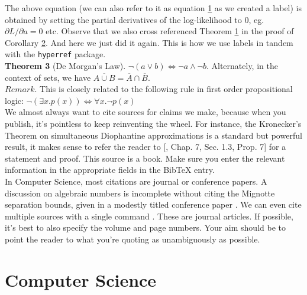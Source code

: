 \documentclass[10pt, A4]{article}
\begin{document}
The above equation (we can also refer to it as equation \hyperref[equation1]{1}  as we created a label) is obtained by
setting the partial derivatives of the log-likelihood to 0, eg. $\partial L/\partial a = 0$ etc.
\vspace{0.5em}
Observe that we also cross referenced Theorem \hyperref[theorem1]{1} in the proof of Corollary \hyperref[corollary2]{2}. And here we just
did it again. This is how we use labels in tandem with the \texttt{hyperref} package.\\
\vspace{0.5em}
\textbf{Theorem 3} (De Morgan’s Law). $\neg(a \lor b) \iff \neg a \land \neg b$. Alternately, in the context of sets, we
have $\overline{A \cup B} =\overline{A} \cap \overline{B}$.\\
\vspace{0.5em}
$Remark$. This is closely related to the following rule in first order propositional logic: $\neg(\exists x.p(x))\iff
\forall x.\neg p(x)$\\
\vspace{0.5em}
We almost always want to cite sources for claims we make, because when you publish, it’s pointless
to keep reinventing the wheel. For instance, the Kronecker’s Theorem on simultaneous Diophantine
approximations is a standard but powerful result, it makes sense to refer the reader to [\cite{bourbaki1966general}, Chap.
7, Sec. 1.3, Prop. 7] for a statement and proof. This source is a book. Make sure you enter the
relevant information in the appropriate fields in the BibTeX entry.\\
\vspace{0.5em}
In Computer Science, most citations are journal or conference papers. A discussion on algebraic
numbers is incomplete without citing the Mignotte separation bounds, given in a modestly titled
conference paper \cite{mignotte1982some}. We can even cite multiple sources with a single command \cite{bell2007positivity,renegar1992computational}. These are
journal articles. If possible, it’s best to also specify the volume and page numbers. Your aim
should be to point the reader to what you’re quoting as unambiguously as possible.\\
	


\section{Computer Science}
\end{document}
